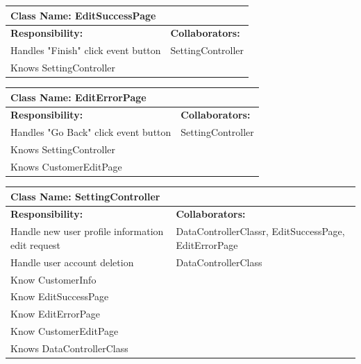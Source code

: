\documentclass[]{article}
\begin{document}
	\begin{table}[H]
	\centering
	\begin{tabular}{|p{6cm}|p{6cm}|}
	\hline 
		\multicolumn{2}{|l|}{\textbf{Class Name: EditSuccessPage}} \\
	\hline
	\textbf{Responsibility:} & \textbf{Collaborators:} \\
	\hline 
	Handles "Finish" click event button & SettingController\\ \hline 
	Knows SettingController &\\ \hline
	\end{tabular}
	\end{table}
	
	\begin{table}[H]
	\centering
	\begin{tabular}{|p{6cm}|p{6cm}|}
	\hline 
		\multicolumn{2}{|l|}{\textbf{Class Name: EditErrorPage}} \\
	\hline
	\textbf{Responsibility:} & \textbf{Collaborators:} \\
	\hline 
	Handles "Go Back" click event button & SettingController\\ \hline 
	Knows SettingController &\\ \hline
	Knows CustomerEditPage &\\ \hline
	\end{tabular}
	\end{table}
	
	\begin{table}[H]
	\centering
	\begin{tabular}{|p{6cm}|p{6cm}|}
	\hline 
		\multicolumn{2}{|l|}{\textbf{Class Name: SettingController}} \\
	\hline
	\textbf{Responsibility:} & \textbf{Collaborators:} \\
	\hline
	Handle new user profile information edit request & DataControllerClassr, EditSuccessPage, EditErrorPage\\ \hline
	Handle user account deletion & DataControllerClass\\ \hline
	Know CustomerInfo & \\ \hline 
	Know EditSuccessPage & \\ \hline 
	Know EditErrorPage & \\ \hline
	Know CustomerEditPage & \\ \hline
	Knows DataControllerClass& \\ \hline
	\end{tabular}
	\end{table}
	
\end{document}
